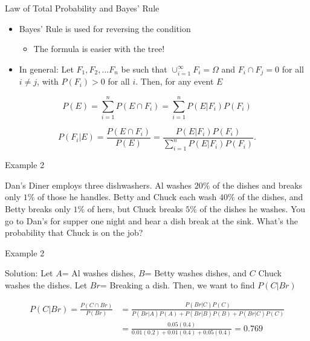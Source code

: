 \documentclass[
  ignorenonframetext,
]{beamer}
\providecommand{\tightlist}{%
  \setlength{\itemsep}{0pt}\setlength{\parskip}{0pt}}
\begin{document}
\begin{frame}{Law of Total Probability and Bayes' Rule}
\label{law-of-total-probability-and-bayes-rule-1}
\begin{itemize}
\item
  Bayes' Rule is used for reversing the condition

  \begin{itemize}
  \tightlist
  \item
    The formula is easier with the tree!
  \end{itemize}
\item
  In general: Let \(F_1, F_2, \ldots F_n\) be such that
  \(\cup_{i=1}^{\infty} F_i=\Omega\) and \(F_i\cap F_j=0\) for all
  \(i\neq j\), with \(P(F_i)>0\) for all \(i\). Then, for any event
  \(E\)
\end{itemize}

\[P(E)=\sum_{i=1}^n P(E \cap F_i)=\sum_{i=1}^n P(E|F_i)P(F_i)\]

\[P(F_i|E)=\frac{P(E \cap F_i)}{P(E)}=\frac{P(E|F_i)P(F_i)}{\sum_{i=1}^nP(E|F_i)P(F_i)}.\]
\end{frame}

\begin{frame}{Example 2}
\label{example-2}
\begin{tcolorbox}
Dan's Diner employs three dishwashers. Al washes $20\%$ of the dishes and breaks only $1\%$ of those he handles. Betty and Chuck each wash $40\%$ of the dishes, and Betty breaks only $1\%$ of hers, but Chuck breaks $5\%$ of the dishes he washes. You go to Dan's for supper one night and hear a dish break at the sink. What's the probability that Chuck is on the job?


\end{tcolorbox}
\end{frame}

\begin{frame}{Example 2}
\label{example-2-1}
\begin{tcolorbox}
Solution:  Let $A$= Al washes dishes, $B$= Betty washes dishes, and $C$ Chuck washes the dishes. Let $Br$= Breaking a dish. Then, we want to find $P(C|Br)$

$$\begin{array}{ll}
P(C|Br)=\frac{P(C\cap Br)}{P(Br)}&=\frac{P(Br|C)P(C)}{P(Br|A)P(A)+P(Br|B)P(B)+P(Br|C)P(C)}\\
&=\frac{0.05(0.4)}{0.01(0.2)+0.01(0.4)+0.05(0.4)}=0.769\end{array}$$
\end{tcolorbox}
\end{frame}
\end{document}

